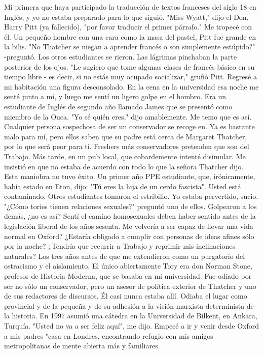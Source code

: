 Mi primera que haya participado la traducción de textos franceses del siglo 18 en Inglés, y yo no estaba preparado para lo que siguió.
"Miss Wyatt," dijo el Don, Harry Pitt (ya fallecido), "por favor traducir el primer párrafo."
Me tropecé con él.
Un pequeño hombre con una cara como la masa del pastel, Pitt fue grande en la bilis.
"No Thatcher se niegan a aprender francés o son simplemente estúpido?" -preguntó.
Los otros estudiantes se rieron.
Las lágrimas pinchaban la parte posterior de los ojos.
"Le sugiero que tome algunas clases de francés básico en su tiempo libre - es decir, si no estás muy ocupado socializar," gruñó Pitt.
Regresé a mi habitación una figura desconsolado.
En la cena en la universidad esa noche me senté junto a mí, y luego me sentí un ligero golpe en el hombro.
Era un estudiante de Inglés de segundo año llamado James que se presentó como miembro de la Ouca.
"Yo sé quién eres," dijo amablemente.
Me temo que es así.
Cualquier persona sospechosa de ser un conservador se recoge en.
Ya es bastante malo para mí, pero ellos saben que su padre está cerca de Margaret Thatcher, por lo que será peor para ti.
Freshers más conservadores pretenden que son del Trabajo.
Más tarde, en un pub local, que cobardemente intenté disimular.
Me insistió en que no estaba de acuerdo con todo lo que la señora Thatcher dijo.
Esta maniobra no tuvo éxito.
Un primer año PPE estudiante, que, irónicamente, había estado en Eton, dijo: "Tú eres la hija de un cerdo fascista".
Usted está contaminado.
Otros estudiantes tomaron el estribillo.
Yo estaba pervertido, sucio.
"¿Cómo tories tienen relaciones sexuales?" preguntó uno de ellos.
Golpearon a los demás, ¿no es así?
Sentí el camino homosexuales deben haber sentido antes de la legislación liberal de los años sesenta.
Me volvería a ser capaz de llevar una vida normal en Oxford?
¿Estaría obligado a cumplir con personas de ideas afines sólo por la noche?
¿Tendría que recurrir a Trabajo y reprimir mis inclinaciones naturales?
Los tres años antes de que me extendieron como un purgatorio del ostracismo y el aislamiento.
El único abiertamente Tory era don Norman Stone, profesor de Historia Moderna, que se basaba en mi universidad.
Fue odiado por ser no sólo un conservador, pero un asesor de política exterior de Thatcher y uno de sus redactores de discursos.
Él casi nunca estaba allí.
Odiaba el lugar como provincial y de la pequeña y de su adhesión a la visión marxista-determinista de la historia.
En 1997 asumió una cátedra en la Universidad de Bilkent, en Ankara, Turquía.
"Usted no va a ser feliz aquí", me dijo.
Empecé a ir y venir desde Oxford a mis padres "casa en Londres, encontrando refugio con mis amigos metropolitanas de mente abierta más y familiares.

